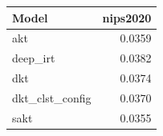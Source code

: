 \begin{tabular}{lr}
\toprule
Model & nips2020 \\
\midrule
akt & 0.0359 \\
deep\_irt & 0.0382 \\
dkt & 0.0374 \\
dkt\_clst\_config & 0.0370 \\
sakt & 0.0355 \\
\bottomrule
\end{tabular}
